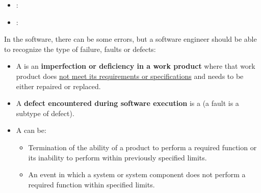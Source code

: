 \begin{itemize}
\begin{itemize}
        
        \item \underline{}: 
        
        
        \item \underline{}: 
    \end{itemize}
\end{itemize}
In the software, there can be some errors, but a software engineer should be able to recognize the type of failure, faults or defects:
\begin{itemize}
    \item A  is an \textbf{imperfection or deficiency in a work product} where that work product does \underline{not meet its requirements or specifications} and needs to be either repaired or replaced.

    \item A \textbf{defect encountered during software execution} is a  (a fault is a subtype of defect).
    
    \item A  can be:
    \begin{itemize}
        \item Termination of the ability of a product to perform a required function or its inability to perform within previously specified limits.

        \item An event in which a system or system component does not perform a required function within specified limits.
    \end{itemize}
\end{itemize}